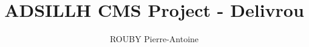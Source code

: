 \documentclass[a4paper,11pt]{report}
\title{ADSILLH CMS Project - Delivrou}
\author{ROUBY Pierre-Antoine}
\begin{document}
\maketitle
\tableofcontents

\begin{abstract}
\end{abstract}

\chapter{}
\end{document}
